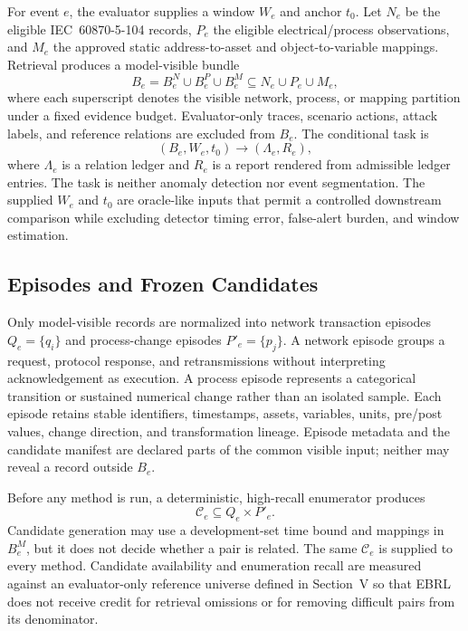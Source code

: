 \documentclass[conference]{IEEEtran}
\begin{document}
For event $e$, the evaluator supplies a window $W_e$ and anchor $t_0$. Let $N_e$ be the eligible IEC~60870-5-104 records, $P_e$ the eligible electrical/process observations, and $M_e$ the approved static address-to-asset and object-to-variable mappings. Retrieval produces a model-visible bundle
\begin{equation}
B_e=B_e^N\cup B_e^P\cup B_e^M\subseteq N_e\cup P_e\cup M_e,
\end{equation}
where each superscript denotes the visible network, process, or mapping partition under a fixed evidence budget. Evaluator-only traces, scenario actions, attack labels, and reference relations are excluded from $B_e$. The conditional task is
\begin{equation}
(B_e,W_e,t_0)\longrightarrow(\Lambda_e,R_e),
\end{equation}
where $\Lambda_e$ is a relation ledger and $R_e$ is a report rendered from admissible ledger entries. The task is neither anomaly detection nor event segmentation. The supplied $W_e$ and $t_0$ are oracle-like inputs that permit a controlled downstream comparison while excluding detector timing error, false-alert burden, and window estimation.

\subsection{Episodes and Frozen Candidates}

Only model-visible records are normalized into network transaction episodes $Q_e=\{q_i\}$ and process-change episodes $P'_e=\{p_j\}$. A network episode groups a request, protocol response, and retransmissions without interpreting acknowledgement as execution. A process episode represents a categorical transition or sustained numerical change rather than an isolated sample. Each episode retains stable identifiers, timestamps, assets, variables, units, pre/post values, change direction, and transformation lineage. Episode metadata and the candidate manifest are declared parts of the common visible input; neither may reveal a record outside $B_e$.

Before any method is run, a deterministic, high-recall enumerator produces
\begin{equation}
\mathcal{C}_e\subseteq Q_e\times P'_e.
\end{equation}
Candidate generation may use a development-set time bound and mappings in $B_e^M$, but it does not decide whether a pair is related. The same $\mathcal{C}_e$ is supplied to every method. Candidate availability and enumeration recall are measured against an evaluator-only reference universe defined in Section~V so that EBRL does not receive credit for retrieval omissions or for removing difficult pairs from its denominator.
\end{document}
